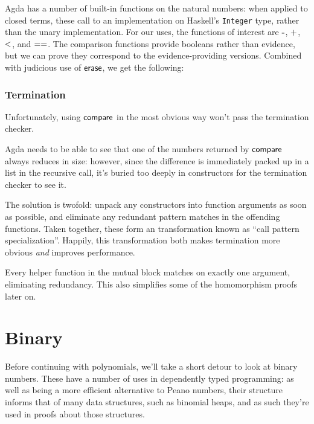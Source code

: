 \documentclass[draft, twocolumn]{article}
\theoremstyle{definition}
\begin{document}
Agda has a number of built-in functions on the natural numbers: when applied to
closed terms, these call to an implementation on Haskell's \texttt{Integer}
type, rather than the unary implementation. For our uses, the functions of
interest are \(\AgdaFunction{-}\), \(\AgdaFunction{+}\), \(\AgdaFunction{<}\),
and \(\AgdaFunction{==}\). The comparison functions provide booleans rather than
evidence, but we can prove they correspond to the evidence-providing versions.
Combined with judicious use of \(\AgdaFunction{erase}\), we get the following:
\subsubsection{Termination}
Unfortunately, using \(\AgdaFunction{compare}\) in the most obvious way won't
pass the termination checker.

Agda needs to be able to see that one of the numbers returned by
\(\AgdaFunction{compare}\) always reduces in size: however, since the difference
is immediately packed up in a list in the recursive call, it's buried too deeply
in constructors for the termination checker to see it.

The solution is twofold: unpack any constructors into function arguments as soon
as possible, and eliminate any redundant pattern matches in the offending
functions. Taken together, these form an transformation known as ``call pattern
specialization''\cite{jones_call-pattern_2007}\footnotemark. Happily, this
transformation both makes termination more obvious \emph{and} improves
performance.


Every helper function in the mutual block matches on exactly one argument,
eliminating redundancy. This also simplifies some of the homomorphism proofs
later on.
\section{Binary}
Before continuing with polynomials, we'll take a short detour to look at binary
numbers. These have a number of uses in dependently typed programming: as well
as being a more efficient alternative to Peano numbers, their structure informs
that of many data structures, such as binomial heaps, and as such they're used
in proofs about those structures.
\end{document}
